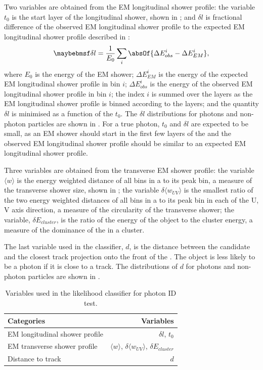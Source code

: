 Two variables are obtained from the EM longitudinal shower profile: the variable $t_0$ is the start layer of the longitudinal shower, shown in ; and $\delta{l}$ is fractional difference of the observed EM longitudinal shower profile to the expected EM longitudinal shower profile described in :
\begin{equation}
\delta l = \frac{1}{E_0}\sum_{i}^{}\absOf{\Delta E_{obs}^i - \Delta E_{EM}^i },
\end{equation}
where $E_0$ is the energy of the EM shower; $\Delta E_{EM}^i$ is the energy of the expected EM longitudinal shower profile in bin $i$;  $\Delta E_{obs}^i$ is the energy of the observed EM longitudinal shower profile in bin $i$; the index $i$ is summed over the \ECAL layers as the EM longitudinal shower profile is binned according to the \ECAL layers; and the quantity $\delta l$ is minimised as a function of the $t_0$. The $\delta l$ distributions for photons and non-photon particles are shown in . For a true photon, $t_0$  and $\delta l $ are expected to be small, as an EM shower should start in the first few layers of the \ECAL and the observed EM longitudinal shower profile should be similar to an expected EM longitudinal shower profile.

Three variables are obtained from the transverse EM shower profile: the variable $\langle{w}\rangle$ is the energy weighted \rms distance of all bins in a \ShowerPeak to its peak bin, a measure of the transverse shower size, shown in ; the variable $\delta{\langle{w_{UV}}\rangle}$ is the smallest ratio of the two energy weighted \rms distances of all bins in a \ShowerPeak to its peak bin in each of the U, V axis direction, a measure of the circularity of the transverse shower; the variable, $\delta E_{cluster}$, is the  ratio of the energy of the \ShowerPeak object to the cluster energy, a measure of the dominance of the \ShowerPeak in a cluster.

The last variable used in the classifier, $d$, is the distance between the candidate and the closest track projection onto the front of the \ECAL. The \ShowerPeak object is less likely to be a photon if it is close to a track. The distributions of $d$ for photons and non-photon particles are shown in .


\begin{table}[htbp] \centering \smallskip
\begin{tabular}{l r }
\hline
\hline
Categories&  Variables\\
\hline
EM longitudinal  shower profile & $\delta{l}$, $t_0$ \\
EM transverse  shower profile & $\langle{w}\rangle$, $\delta{\langle{w_{UV}}\rangle}$, $\delta E_{cluster}$ \\
Distance to track &  $d$ \\
\hline
\hline
\end{tabular}
\caption
{Variables used in the likelihood classifier for photon ID test.}
\label{tab:photonPhotonIDvar}
\end{table}


